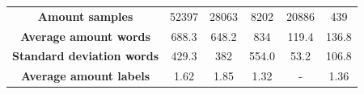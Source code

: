 \begin{table}[H]
{\begin{tabular}{cccccc}
\footnotesize \textbf{Amount samples}                   & \footnotesize 52397                                                                                     & \footnotesize 28063                                                                                     & \footnotesize 8202                                                                                      & \footnotesize 20886                                                                                                    & \footnotesize 439                                                                                                                                    \\
\footnotesize \textbf{Average amount words}             & \footnotesize 688.3                                                                                     &\footnotesize  648.2                                                                                     & \footnotesize 834                                                                                       & \footnotesize 119.4                                                                                                    & \footnotesize 136.8                                                                                                                                  \\
\footnotesize \textbf{Standard deviation words}  &  \footnotesize 429.3                                                                                     & \footnotesize 382                                                                                       & \footnotesize 554.0                                                                                     & \footnotesize 53.2                                                                                                     & \footnotesize 106.8                                                                                                                                  \\
\footnotesize \textbf{Average amount labels}            & \footnotesize 1.62                                                                                      &\footnotesize  1.85                                                                                      & \footnotesize 1.32                                                                                      & \footnotesize -                                                                                              & \footnotesize 1.36                                                                                                                                   \\

\end{tabular}}
\end{table}
